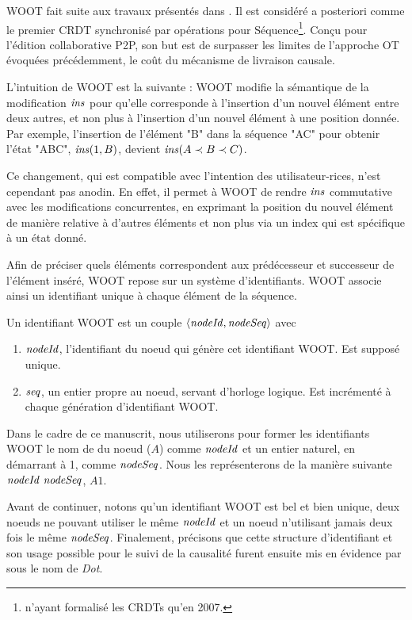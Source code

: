 WOOT \cite{2006-woot-oster} fait suite aux travaux présentés dans \cite{2006-tombstone-transformation-functions-oster}.
Il est considéré a posteriori comme le premier \ac{CRDT} synchronisé par opérations pour Séquence\footnote{\cite{2007-crdt-shapiro} n'ayant formalisé les \acp{CRDT} qu'en 2007.}.
Conçu pour l'édition collaborative \ac{P2P}, son but est de surpasser les limites de l'approche \ac{OT} évoquées précédemment, \ie le coût du mécanisme de livraison causale.

L'intuition de WOOT est la suivante : WOOT modifie la sémantique de la modification $\mathit{ins}$ pour qu'elle corresponde à l'insertion d'un nouvel élément entre deux autres, et non plus à l'insertion d'un nouvel élément à une position donnée.
Par exemple, l'insertion de l'élément "B" dans la séquence "AC" pour obtenir l'état "ABC", \ie $\mathit{ins}(1, B)$, devient $\mathit{ins}(A \prec B \prec C)$.

Ce changement, qui est compatible avec l'intention des utilisateur-rices, n'est cependant pas anodin.
En effet, il permet à WOOT de rendre $\mathit{ins}$ commutative avec les modifications concurrentes, en exprimant la position du nouvel élément de manière relative à d'autres éléments et non plus via un index qui est spécifique à un état donné.

Afin de préciser quels éléments correspondent aux prédécesseur et successeur de l'élément inséré, WOOT repose sur un système d'identifiants.
WOOT associe ainsi un identifiant unique à chaque élément de la séquence.
\begin{definition}
  Un identifiant WOOT est un couple $\langle \mathit{nodeId}, \mathit{nodeSeq} \rangle$ avec
  \begin{enumerate}[label=(\roman*)]
    \item $\mathit{nodeId}$, l'identifiant du noeud qui génère cet identifiant WOOT.
      Est supposé unique.
    \item $\mathit{seq}$, un entier propre au noeud, servant d'horloge logique.
      Est incrémenté à chaque génération d'identifiant WOOT.
  \end{enumerate}
\end{definition}
Dans le cadre de ce manuscrit, nous utiliserons pour former les identifiants WOOT le nom de du noeud (\eg $A$) comme $\mathit{nodeId}$ et un entier naturel, en démarrant à 1, comme $\mathit{nodeSeq}$.
Nous les représenterons de la manière suivante $\mathit{nodeId}~\mathit{nodeSeq}$, \eg $A1$.

Avant de continuer, notons qu'un identifiant WOOT est bel et bien unique, deux noeuds ne pouvant utiliser le même $\mathit{nodeId}$ et un noeud n'utilisant jamais deux fois le même $\mathit{nodeSeq}$.
Finalement, précisons que cette structure d'identifiant et son usage possible pour le suivi de la causalité furent ensuite mis en évidence par \cite{2014-scalable-accurate-causality-tracking} sous le nom de \emph{Dot}.

